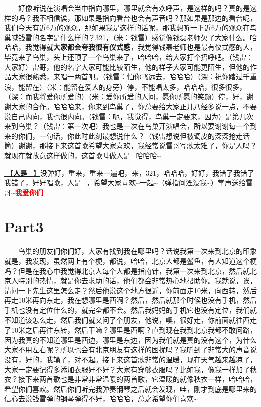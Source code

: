 \documentclass[]{ctexbook}
\begin{document}
  好像听说在演唱会当中指向哪里，哪里就会有欢呼声，是这样的吗？真的是这样的吗？我不相信诶，那如果是指向看台也会有声音吗？那如果是那边的看台呢，我们今天有近6万的观众，那如果我是这样的话呢，那我想听一下近6万的观众在鸟巢喊钱雷的名字是什么样的？321，（米：钱雷）感觉像钱磊老师欠了大家什么。哈哈哈，我觉得就\textbf{大家都会夸我很有仪式感}，我觉得钱磊老师也是最有仪式感的人，毕竟来了鸟巢，头上还顶了一个鸟巢来了，哈哈哈，给大家打个招呼吧。（钱雷：大家好）雷哥，他的名字大家可能比较陌生，他的样子大家可能更陌生，但他的作品大家很熟悉，来唱一两首吧。（钱雷：怕你飞远去，哈哈哈）（深：祝你踏过千重浪，能留在）（米：能留在爱人的身旁）停，不能唱太多，哈哈哈，很多很多，（深：而我将爱你所爱的）（米：爱你所爱的人间，愿你所愿的笑颜）停，好，谢谢大家的合作。哈哈哈来，你来到鸟巢了，你总要给大家正儿八经多说一点，不要说自己内向，我也很内向。（钱雷：呃，我觉得，鸟巢一定要来，因为）是第几次来到鸟巢？（钱雷：第一次吧）我也是一次在鸟巢开演唱会，所以要谢谢每一个到来的你们，一句话，你此时此刻最想说什么？（钱雷想说但被调皮的深深抢走话筒）谢谢，那接下来这首歌希望大家喜欢，我经常说雷哥写歌太难了，你是人吗？就现在就故意这样做的，这首歌叫做人是\_哈哈哈\textasciitilde{}

\hyperref[renshi]{🎵【\textbf{人是\_}】}没弹好，重来，重来一遍吧，来，321，哈哈哈，好好，我错了我错了我错了，好好唱歌，人是\_，希望大家喜欢\textasciitilde 一起\textasciitilde（弹指间湮没我\textasciitilde）掌声送给雷哥\textasciitilde{}\textbf{\textcolor{red}{我爱你们~} }

\section{Part3}\label{beijing-20240922-part3}

  鸟巢的朋友们你们好，大家有找到我在哪里吗？话说我第一次来到北京的印象就是，我发现，虽然网上有个梗，都说，哈哈，北京人都是鲨鱼，有人知道这个梗吗？但是在我心中我觉得北京人每个人都是指南针，我第一次来到北京，然后就北京人特别的热情，就是你去求助的话，他们都会非常热心地帮助你。我就说，诶，请问一下先生这里怎么走？然后他说这个地方很近，你前面走10米，向西转，然后再走10米再向东走，我在想哪里是西啊？然后，然后就那个时候也没有手机，然后手机也没有定位什么的，就完全都不会。然后我妈妈的手机它也没有定位，我们就不知道该怎么走，然后我们就又问了个朋友，他说，噢，很好走，你前面就往西走了10米之后再往东转，然后干嘛？哪里是西啊？直到现在我到北京我都不敢问路，因为我真的不知道哪里是西边，哪里是东边，因为我们就是真的没有这个，为什么大家不用左右呢？所以也会有北京朋友有这样的困扰吗？我听到了非常大的声音说没有，好的，我输了，对不起。接下来这首歌非常的温暖，现在天气越来越凉了，大家一定要记得多添加衣服好不好？大家有穿够衣服吗？比如我，像我一样加了秋衣？接下来两首歌也是非常非常温暖的两首歌，它温暖的就像秋衣一样，哈哈哈，希望你们喜欢。然后你们听完我弹奏钢琴之后就会发现，哇，刚才到底是哪里来的信心去说钱雷弹的钢琴弹得不好，哈哈哈，总之希望你们喜欢\textasciitilde{}
\end{document}
